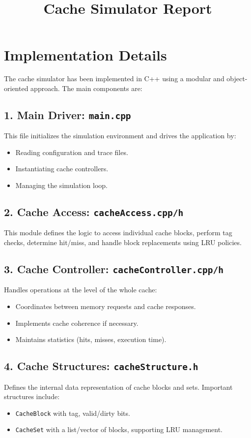 \documentclass[11pt]{article}
\title{Cache Simulator Report}
\author{}
\date{}
\begin{document}
\maketitle

\section{Implementation Details}

The cache simulator has been implemented in C++ using a modular and object-oriented approach. The main components are:

\subsection*{1. Main Driver: \texttt{main.cpp}}
This file initializes the simulation environment and drives the application by:
\begin{itemize}
  \item Reading configuration and trace files.
  \item Instantiating cache controllers.
  \item Managing the simulation loop.
\end{itemize}

\subsection*{2. Cache Access: \texttt{cacheAccess.cpp/h}}
This module defines the logic to access individual cache blocks, perform tag checks, determine hit/miss, and handle block replacements using LRU policies.

\subsection*{3. Cache Controller: \texttt{cacheController.cpp/h}}
Handles operations at the level of the whole cache:
\begin{itemize}
  \item Coordinates between memory requests and cache responses.
  \item Implements cache coherence if necessary.
  \item Maintains statistics (hits, misses, execution time).
\end{itemize}

\subsection*{4. Cache Structures: \texttt{cacheStructure.h}}
Defines the internal data representation of cache blocks and sets. Important structures include:
\begin{itemize}
  \item \texttt{CacheBlock} with tag, valid/dirty bits.
  \item \texttt{CacheSet} with a list/vector of blocks, supporting LRU management.
\end{itemize}
\end{document}
